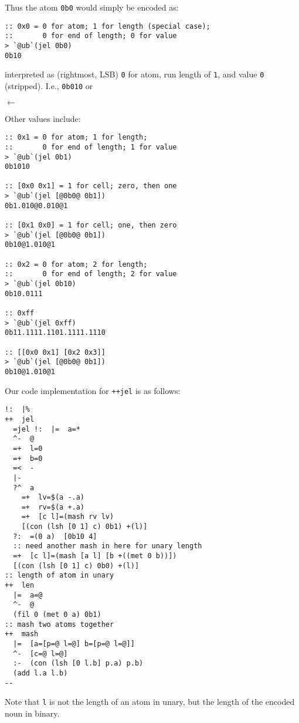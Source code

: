 \documentclass[twoside]{article}
\newcommand{\bit}[1]{%
  \tikz[baseline=(char.base)]{%
    \node[shape=rectangle, draw, rounded corners=1pt, inner sep=1pt, minimum width=6pt, minimum height=6pt] (char) {#1};
  }%
}
\begin{document}
Thus the atom \texttt{0b0} would simply be encoded as:

\begin{lstlisting}[style=listingcode]
:: 0x0 = 0 for atom; 1 for length (special case);
::       0 for end of length; 0 for value
> `@ub`(jel 0b0)
0b10
\end{lstlisting}

\noindent{}
interpreted as (rightmost, LSB) \texttt{0} for atom, run length of \texttt{1}, and value \texttt{0} (stripped).  I.e., \texttt{0b010} or

{
\centering
$\leftarrow$ \\
\bit{0} \bit{1} \bit{0}
}

Other values include:

\begin{lstlisting}[style=listingcode]
:: 0x1 = 0 for atom; 1 for length;
::       0 for end of length; 1 for value
> `@ub`(jel 0b1)
0b1010

:: [0x0 0x1] = 1 for cell; zero, then one
> `@ub`(jel [@0b0@ 0b1])
0b1.010@0.010@1

:: [0x1 0x0] = 1 for cell; one, then zero
> `@ub`(jel [@0b0@ 0b1])
0b10@1.010@1

:: 0x2 = 0 for atom; 2 for length;
::       0 for end of length; 2 for value
> `@ub`(jel 0b10)
0b10.0111

:: 0xff
> `@ub`(jel 0xff)
0b11.1111.1101.1111.1110

:: [[0x0 0x1] [0x2 0x3]]
> `@ub`(jel [@0b0@ 0b1])
0b10@1.010@1
\end{lstlisting}

Our code implementation for \texttt{++jel} is as follows:

\begin{lstlisting}[style=listingcode]
!:  |%
++  jel
  =jel !:  |=  a=*
  ^-  @
  =+  l=0
  =+  b=0
  =<  -
  |-
  ?^  a
    =+  lv=$(a -.a)
    =+  rv=$(a +.a)
    =+  [c l]=(mash rv lv)
    [(con (lsh [0 1] c) 0b1) +(l)]
  ?:  =(0 a)  [0b10 4]
  :: need another mash in here for unary length
  =+  [c l]=(mash [a l] [b +((met 0 b))])
  [(con (lsh [0 1] c) 0b0) +(l)]
:: length of atom in unary
++  len
  |=  a=@
  ^-  @
  (fil 0 (met 0 a) 0b1)
:: mash two atoms together
++  mash
  |=  [a=[p=@ l=@] b=[p=@ l=@]]
  ^-  [c=@ l=@]
  :-  (con (lsh [0 l.b] p.a) p.b)
  (add l.a l.b)
--
\end{lstlisting}

Note that \texttt{l} is not the length of an atom in unary, but the length of the encoded noun in binary.
\end{document}
